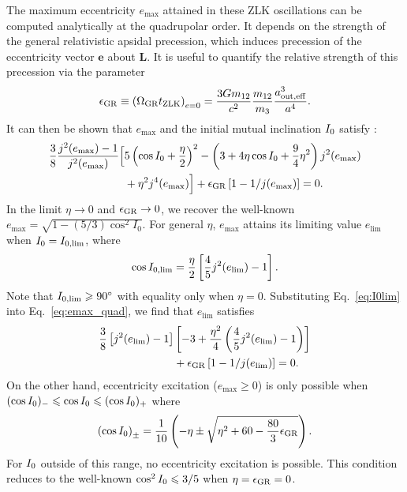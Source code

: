 \documentclass[
        fleqn,
        usenatbib,
    ]{mnras}
\newcommand*{\p}[1]{\left(#1\right)}
\newcommand*{\s}[1]{\left[#1\right]}
\newcommand*{\bm}[1]{\mathbf{#1}}
\begin{document}
The maximum eccentricity $e_{\max}$ attained in these ZLK oscillations can be
computed analytically at the quadrupolar order. It depends on the strength of
the general relativistic apsidal precession, which induces precession of the
eccentricity vector $\bm{e}$ about $\bm{L}$. It is useful to quantify the
relative strength of this precession via the parameter
\begin{equation}
    \epsilon_{\rm GR} \equiv \p{\Omega_{\rm GR} t_{\rm ZLK}}_{e = 0}
        = \frac{3Gm_{12}}{c^2} \frac{m_{12}}{m_3}\frac{a_{\rm out, eff}^3}{a^4}.
\end{equation}
It can then be shown that $e_{\max}$ and the initial mutual inclination $I_{\rm
0}$ satisfy \citep{LML15, anderson2016formation}:
\begin{align}
    \frac{3}{8}\frac{j^2(e_{\max}) - 1}{j^2(e_{\max})}\Big[&
        5\p{\cos I_0 + \frac{\eta}{2}}^2
        - \p{3 + 4\eta \cos I_0 + \frac{9}{4}\eta^2}j^2(e_{\max})
            \nonumber\\
        &+ \eta^2 j^4(e_{\max})
    \Big] + \epsilon_{\rm GR}\s{1 - 1 / j(e_{\max})} = 0.\label{eq:emax_quad}
\end{align}
In the limit $\eta \to 0$ and $\epsilon_{\rm GR} \to 0$, we recover the
well-known $e_{\max} = \sqrt{1 - (5/3) \cos^2 I_0}$. For general $\eta$,
$e_{\max}$ attains its limiting value $e_{\lim}$ when $I_{\rm 0} = I_{\rm 0,
\lim}$, where
\begin{equation}
    \cos I_{\rm 0, \lim} = \frac{\eta}{2}\s{\frac{4}{5}j^2(e_{\lim}) -
        1}.\label{eq:I0lim}
\end{equation}
Note that $I_{\rm 0, \lim} \geq 90^\circ$ with equality only when $\eta
= 0$. Substituting Eq.~\eqref{eq:I0lim} into Eq.~\eqref{eq:emax_quad}, we find
that $e_{\lim}$ satisfies
\begin{align}
    \frac{3}{8}\s{j^2(e_{\lim}) - 1}&\s{-3 + \frac{\eta^2}{4}
        \p{\frac{4}{5}j^2(e_{\lim}) - 1}}\nonumber\\
        &+ \epsilon_{\rm GR}\s{1 - 1 / j(e_{\lim})} = 0.
        \label{eq:def_elim}
\end{align}
On the other hand, eccentricity excitation ($e_{\max} \geq 0$) is only possible
when $(\cos I_{\rm 0})_- \leq \cos I_{\rm 0} \leq (\cos I_{\rm 0})_+$ where
\begin{equation}
    \p{\cos I_{\rm 0}}_{\pm} = \frac{1}{10}\p{-\eta \pm \sqrt{\eta^2 + 60 -
        \frac{80}{3}\epsilon_{\rm GR}}}.\label{eq:I0bounds}
\end{equation}
For $I_{\rm 0}$ outside of this range, no eccentricity excitation is possible.
This condition reduces to the well-known $\cos^2 I_{\rm 0} \leq 3/5$ when $\eta
= \epsilon_{\rm GR} = 0$.
\end{document}
